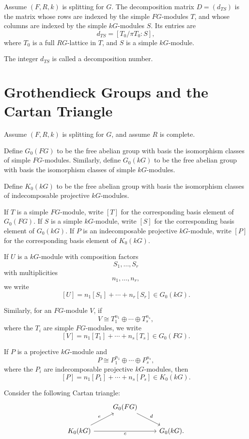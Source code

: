\begin{definition}
Assume \((F,R,k)\) is splitting for \(G\).
The decomposition matrix \(D=(d_{TS})\) is the matrix whose rows are indexed by
the simple \(FG\)-modules \(T\), and whose columns are indexed by the simple
\(kG\)-modules \(S\). Its entries are
\[
d_{TS}
=
\left[T_0/\pi T_0:S\right],
\]
where \(T_0\) is a full \(RG\)-lattice in \(T\), and \(S\) is a simple \(kG\)-module.

The integer \(d_{TS}\) is called a decomposition number.
\end{definition}

\section{Grothendieck Groups and the Cartan Triangle}

Assume \((F,R,k)\) is splitting for \(G\), and assume \(R\) is complete.

Define \(G_0(FG)\) to be the free abelian group with basis the isomorphism classes of
simple \(FG\)-modules. Similarly, define \(G_0(kG)\) to be the free abelian group with
basis the isomorphism classes of simple \(kG\)-modules.

Define \(K_0(kG)\) to be the free abelian group with basis the isomorphism classes of
indecomposable projective \(kG\)-modules.

If \(T\) is a simple \(FG\)-module, write \([T]\) for the corresponding basis element of
\(G_0(FG)\). If \(S\) is a simple \(kG\)-module, write \([S]\) for the corresponding basis
element of \(G_0(kG)\). If \(P\) is an indecomposable projective \(kG\)-module, write
\([P]\) for the corresponding basis element of \(K_0(kG)\).

If \(U\) is a \(kG\)-module with composition factors
\[
S_1,\dots,S_r
\]
with multiplicities
\[
n_1,\dots,n_r,
\]
we write
\[
[U]=n_1[S_1]+\cdots+n_r[S_r]\in G_0(kG).
\]

Similarly, for an \(FG\)-module \(V\), if
\[
V\cong T_1^{n_1}\oplus\cdots\oplus T_s^{n_s},
\]
where the \(T_i\) are simple \(FG\)-modules, we write
\[
[V]=n_1[T_1]+\cdots+n_s[T_s]\in G_0(FG).
\]

If \(P\) is a projective \(kG\)-module and
\[
P\cong P_1^{n_1}\oplus\cdots\oplus P_s^{n_s},
\]
where the \(P_i\) are indecomposable projective \(kG\)-modules, then
\[
[P]=n_1[P_1]+\cdots+n_s[P_s]\in K_0(kG).
\]

Consider the following Cartan triangle:
\[
\begin{tikzcd}
& G_0(FG) \arrow[dr,"d"] & \\
K_0(kG) \arrow[ur,"e"] \arrow[rr,"c"'] && G_0(kG).
\end{tikzcd}
\]

